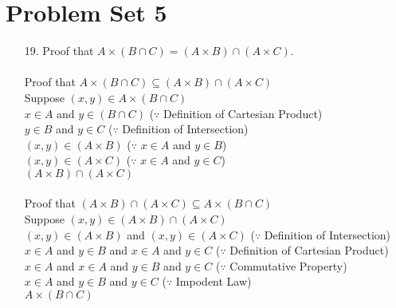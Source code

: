 \documentclass[12pt]{article}
\begin{document}
\section*{Problem Set 5}
\begin{itemize}
    \item [19.]
        Proof that $A \times (B \cap C) = (A \times B) \cap (A \times C)$. \\
        \\
        Proof that $A \times (B \cap C) \subseteq (A \times B) \cap (A \times C)$ \\
        Suppose $(x, y) \in A \times (B \cap C)$ \\
        $x \in A$ and $y \in (B \cap C)$ \hspace{5em} ($\because$ Definition of Cartesian
            Product) \\
        $y \in B$ and $y \in C$ \hspace{6em} ($\because$ Definition of Intersection) \\
        $(x, y) \in (A \times B)$ \hspace{7em} ($\because$ $x \in A$ and $y \in B$) \\
        $(x, y) \in (A \times C)$ \hspace{7em} ($\because$ $x \in A$ and $y \in C$) \\
        $(A \times B) \cap (A \times C)$ \\
        \\
        Proof that $(A \times B) \cap (A \times C) \subseteq A \times (B \cap C)$ \\
        Suppose $(x, y) \in (A \times B) \cap (A \times C)$ \\
        $(x, y) \in (A \times B)$ and $(x, y) \in (A \times C)$ \hspace{2em} ($\because$
            Definition of Intersection) \\
        $x \in A$ and $y \in B$ and $x \in A$ and $y \in C$ \hspace{3em} ($\because$
            Definition of Cartesian Product) \\
        $x \in A$ and $x \in A$ and $y \in B$ and $y \in C$ \hspace{3em} ($\because$
            Commutative Property) \\
        $x \in A$ and $y \in B$ and $y \in C$ \hspace{3em} ($\because$ Impodent Law) \\
        $A \times (B \cap C)$
\end{itemize}
\end{document}
